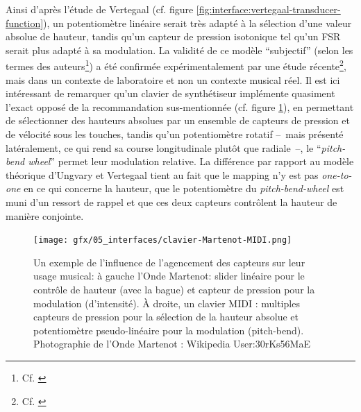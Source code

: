 \indent Ainsi d'après l'étude de Vertegaal (cf. figure \ref{fig:interface:vertegaal-transducer-function}), un potentiomètre linéaire serait très adapté à la sélection d'une valeur absolue de hauteur, tandis qu'un capteur de pression isotonique tel qu'un \gls{FSR} serait plus adapté à sa modulation. La validité de ce modèle ``subjectif'' (selon les termes des auteurs\footnote{Cf. \cite{ungvary_cognition_1999}}) a été confirmée expérimentalement par une étude récente\footnote{Cf. \cite{malloch_design_2019}}, mais dans un contexte de laboratoire et non un contexte musical réel. Il est ici intéressant de remarquer qu'un clavier de synthétiseur implémente quasiment l'exact opposé de la recommandation sus-mentionnée (cf. figure \ref{fig:interface:martenot-clavier}), en permettant de sélectionner des hauteurs absolues par un ensemble de capteurs de pression et de vélocité sous les touches, tandis qu'un potentiomètre rotatif --~mais présenté latéralement, ce qui rend sa course longitudinale plutôt que radiale~--, le ``\textit{pitch-bend wheel}'' permet leur modulation relative. La différence par rapport au modèle théorique d'Ungvary et Vertegaal tient au fait que le mapping n'y est pas \textit{one-to-one} en ce qui concerne la hauteur, que le potentiomètre du \textit{pitch-bend-wheel} est muni d'un ressort de rappel et que ces deux capteurs contrôlent la hauteur de manière conjointe.\\
\begin{figure}[!htbp]
	\captionsetup{format=plain}%
	\texttt{[image: gfx/05\_interfaces/clavier-Martenot-MIDI.png]}
	\caption[Agencement des capteurs et fonction musicale]{Un exemple de l'influence de l'agencement des capteurs sur leur usage musical: à gauche l'Onde Martenot: slider linéaire pour le contrôle de hauteur (avec la bague) et capteur de pression pour la modulation (d'intensité). À droite, un clavier MIDI : multiples capteurs de pression pour la sélection de la hauteur absolue et potentiomètre pseudo-linéaire pour la modulation (pitch-bend). Photographie de l'Onde Martenot : Wikipedia User:30rKs56MaE}
	\label{fig:interface:martenot-clavier}
\end{figure}
